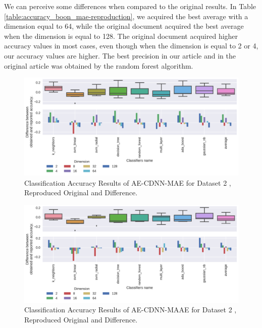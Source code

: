 We can perceive some differences when compared to the original results. In Table \ref{table:accuracy_boon_mae-reproduction}, we acquired the best average with a dimension equal to 64, while the original document acquired the best average when the dimension is equal to 128. The original document acquired higher accuracy values in most cases, even though when the dimension is equal to 2 or 4, our accuracy values are higher. The best precision in our article and in the original article was obtained by the random forest algorithm.








\begin{figure}[!ht]
  \centering
  \includegraphics[width=\linewidth]{figure/table_4.pdf}
  \caption{Classification Accuracy Results of AE-CDNN-MAE for Dataset 2 \cite{WenZha:2018}, Reproduced Original and Difference.}
\label{fig:acc-AE-CDNN-MAE-d2}
\end{figure}

\begin{figure}[!ht]
  \centering
  \includegraphics[width=\linewidth]{figure/table_5.pdf}
  \caption{Classification Accuracy Results of AE-CDNN-MAAE for Dataset 2 \cite{WenZha:2018}, Reproduced Original and Difference.}
\label{fig:acc-AE-CDNN-MAAE-d2}
\end{figure}


